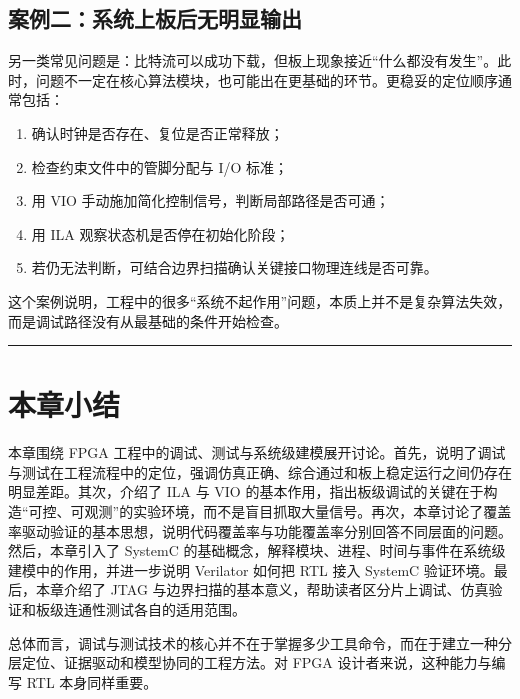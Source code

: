 \subsection{案例二：系统上板后无明显输出}\label{ux6848ux4f8bux4e8cux7cfbux7edfux4e0aux677fux540eux65e0ux660eux663eux8f93ux51fa}

另一类常见问题是：比特流可以成功下载，但板上现象接近``什么都没有发生''。此时，问题不一定在核心算法模块，也可能出在更基础的环节。更稳妥的定位顺序通常包括：

\begin{enumerate}
\def\labelenumi{\arabic{enumi}.}
\tightlist
\item
  确认时钟是否存在、复位是否正常释放；
\item
  检查约束文件中的管脚分配与 I/O 标准；
\item
  用 VIO 手动施加简化控制信号，判断局部路径是否可通；
\item
  用 ILA 观察状态机是否停在初始化阶段；
\item
  若仍无法判断，可结合边界扫描确认关键接口物理连线是否可靠。
\end{enumerate}

这个案例说明，工程中的很多``系统不起作用''问题，本质上并不是复杂算法失效，而是调试路径没有从最基础的条件开始检查。

\begin{center}\rule{0.5\linewidth}{0.5pt}\end{center}

\section{本章小结}\label{ux672cux7ae0ux5c0fux7ed3}

本章围绕 FPGA
工程中的调试、测试与系统级建模展开讨论。首先，说明了调试与测试在工程流程中的定位，强调仿真正确、综合通过和板上稳定运行之间仍存在明显差距。其次，介绍了
ILA 与 VIO
的基本作用，指出板级调试的关键在于构造``可控、可观测''的实验环境，而不是盲目抓取大量信号。再次，本章讨论了覆盖率驱动验证的基本思想，说明代码覆盖率与功能覆盖率分别回答不同层面的问题。然后，本章引入了
SystemC
的基础概念，解释模块、进程、时间与事件在系统级建模中的作用，并进一步说明
Verilator 如何把 RTL 接入 SystemC 验证环境。最后，本章介绍了 JTAG
与边界扫描的基本意义，帮助读者区分片上调试、仿真验证和板级连通性测试各自的适用范围。

总体而言，调试与测试技术的核心并不在于掌握多少工具命令，而在于建立一种分层定位、证据驱动和模型协同的工程方法。对
FPGA 设计者来说，这种能力与编写 RTL 本身同样重要。

